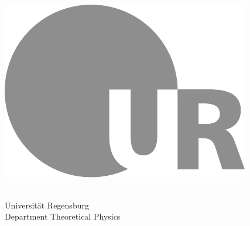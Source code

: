 \documentclass[
	english,
	a4paper,
	fontsize=10pt,
	parskip=half,
	titlepage=true,
	DIV=12,
	final
]{scrreprt}
\title{\myTitle}
\subtitle{\mySubtitle}
\author{\myName}
\date{\today}
\begin{document}
	\begin{titlepage}
		\centering
		\makeatletter						
		
		\Huge \textsc{\@title}
					
		\vspace{6\tabcolsep}
		
		\LARGE \textsc{\@subtitle}

		\vspace{6\tabcolsep}
			
		\large
		\@date\\
		\vspace{7\tabcolsep}
			
		\includegraphics[width=.3\paperwidth]{./gfx/urlogo}
				
		\vspace{6\tabcolsep}
			
		\large
		\@author \\
		Universität Regensburg \\
		Department Theoretical Physics

		\makeatother			%
	\end{titlepage}
	
	{
		\pagestyle{empty}
		\renewcommand*{\chapterpagestyle}{empty}
	}
	
	\setcounter{page}{3}
	
	
\end{document}
